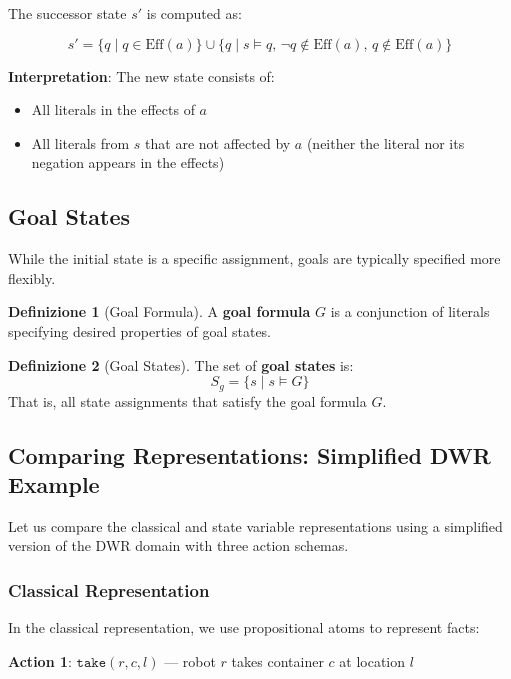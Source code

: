 \documentclass[11pt,a4paper]{article}
\theoremstyle{definition}
\newtheorem{definition}{Definizione}[section]
\theoremstyle{plain}
\theoremstyle{remark}
\begin{document}
The successor state $s'$ is computed as:

\[
s' = \{q \mid q \in \text{Eff}(a)\} \cup \{q \mid s \models q, \, \neg q \notin \text{Eff}(a), \, q \notin \text{Eff}(a)\}
\]

\textbf{Interpretation}: The new state consists of:
\begin{itemize}
    \item All literals in the effects of $a$
    \item All literals from $s$ that are not affected by $a$ (neither the literal nor its negation appears in the effects)
\end{itemize}

\subsection{Goal States}

While the initial state is a specific assignment, goals are typically specified more flexibly.

\begin{definition}[Goal Formula]
A \textbf{goal formula} $G$ is a conjunction of literals specifying desired properties of goal states.
\end{definition}

\begin{definition}[Goal States]
The set of \textbf{goal states} is:
\[
S_g = \{ s \mid s \models G \}
\]
That is, all state assignments that satisfy the goal formula $G$.
\end{definition}



\subsection{Comparing Representations: Simplified DWR Example}

Let us compare the classical and state variable representations using a simplified version of the DWR domain with three action schemas.

\subsubsection{Classical Representation}

In the classical representation, we use propositional atoms to represent facts:

\textbf{Action 1}: $\texttt{take}(r, c, l)$ — robot $r$ takes container $c$ at location $l$
\end{document}
